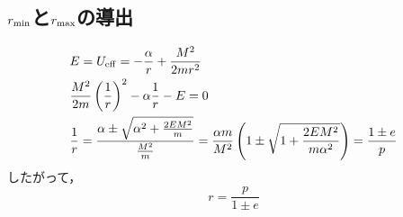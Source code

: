 \documentclass[12pt]{jsarticle}
\begin{document}
	\subsection{$r_{\rm min}$と$r_{\rm max}$の導出}
	\begin{align*}
	&E = U_{\rm eff} = -\frac{\alpha}{r} + \frac{M^2}{2mr^2} \\
	&\frac{M^2}{2m}\left(\frac{1}{r}\right)^2 - \alpha \frac{1}{r} - E = 0 \\
	&\frac{1}{r} = \frac{\alpha \pm \sqrt{\alpha^2 + \frac{2EM^2}{m}}}{\frac{M^2}{m}}
	= \frac{\alpha m}{M^2} \left( 1 \pm \sqrt{1 + \frac{2EM^2}{m\alpha^2}} \right)
	=\frac{1 \pm e}{p}
	\end{align*}
	したがって，
	\[
	r = \frac{p}{1 \pm e}
	\]
\end{document}

